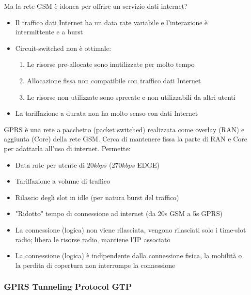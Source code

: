 Ma la rete GSM è idonea per offrire un servizio dati internet? 
\begin{itemize}
	\item Il traffico dati Internet ha un data rate variabile e l'interazione è intermittente e a burst

	\item Circuit-switched non è ottimale:
	\begin{enumerate}
		\item Le risorse pre-allocate sono inutilizzate per molto tempo

		\item Allocazione fissa non compatibile con traffico dati Internet

		\item Le risorse non utilizzate sono sprecate e non utilizzabili da altri utenti
	\end{enumerate}

	\item La tariffazione a durata non ha molto senso con dati Internet
\end{itemize}

GPRS è una rete a pacchetto (packet switched) realizzata come overlay (RAN) e aggiunta (Core) della rete GSM. Cerca di mantenere fissa la parte di RAN e Core per adattarla all'uso di internet. Permette: 
\begin{itemize}
	\item Data rate per utente di $20kbps$ ($270kbps$ EDGE)

	\item Tariffazione a volume di traffico

	\item Rilascio degli slot in idle (per natura burst del traffico)

	\item "Ridotto" tempo di connessione ad internet (da 20s GSM a 5s GPRS)

	\item La connessione (logica) non viene rilasciata, vengono rilasciati solo i time-slot radio; libera le risorse radio, mantiene l'IP associato

	\item La connessione (logica) è indipendente dalla connessione fisica, la mobilità o la perdita di copertura non interrompe la connessione
\end{itemize}

\subsubsection{GPRS Tunneling Protocol GTP}


